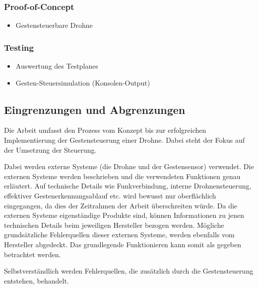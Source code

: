 \subsubsection{Proof-of-Concept}
\begin{itemize}
	\item Gestensteuerbare Drohne
\end{itemize}

\subsubsection{Testing}
\begin{itemize}
	\item Auswertung des Testplanes
	\item Gesten-Steuersimulation (Konsolen-Output)
\end{itemize}


\subsection{Eingrenzungen und Abgrenzungen}
Die Arbeit umfasst den Prozess vom Konzept bis zur erfolgreichen Implementierung der Gestensteuerung einer Drohne.
Dabei steht der Fokus auf der Umsetzung der Steuerung.

Dabei werden externe Systeme (die Drohne und der Gestensensor) verwendet.
Die externen Systeme werden beschrieben und die verwendeten Funktionen genau erläutert.
Auf technische Details wie Funkverbindung, interne Drohnensteuerung, effektiver Gestenerkennungsablauf etc. wird bewusst nur oberflächlich eingegangen, da dies der Zeitrahmen der Arbeit überschreiten würde.
Da die externen Systeme eigenständige Produkte sind, können Informationen zu jenen technischen Details beim jeweiligen Hersteller bezogen werden.
Mögliche grundsätzliche Fehlerquellen dieser externen Systeme, werden ebenfalls vom Hersteller abgedeckt.
Das grundlegende Funktionieren kann somit als gegeben betrachtet werden.

Selbstverständlich werden Fehlerquellen, die zusätzlich durch die Gestensteuerung entstehen, behandelt.
